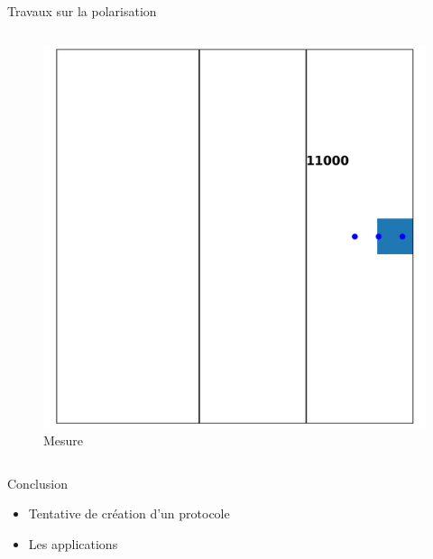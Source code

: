 \documentclass[french]{beamer}
\begin{document}
\begin{frame}{Travaux sur la polarisation}
\begin{columns}
\begin{column}{0.5\textwidth}
\begin{figure}
                \includegraphics[scale=0.05]{Fin.png}
                \caption{\small Mesure}
            \end{figure}
        \end{column}
    \end{columns}
\end{frame}

\begin{frame}{Conclusion}
    \begin{itemize}
        \item Tentative de création d'un protocole
        \item Les applications
    \end{itemize}
\end{frame}
\end{document}
